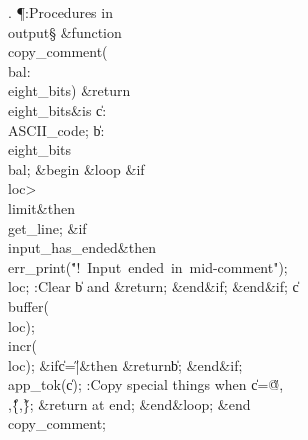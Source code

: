 . \P\?:Procedures in \\{output}\X\mathrel{+}\S\?\6
\&{function}\8\1\\{copy\_comment}\?(\1\?\\{bal}\?:\?\\{eight\_bits}\?\2)%
\&{return}\?\8\\{eight\_bits}\2\8\&{is}\8\1\6
\|c\?:\?\\{ASCII\_code};\6
\|b\?:\?\\{eight\_bits}\?\K\?\\{bal};\6
\4\&{begin}\6
\1\&{loop}\6
\&{if}\1\1\8\\{loc}\?>\?\\{limit}\2\8\&{then}\6
\\{get\_line};\6
\&{if}\1\1\8\\{input\_has\_ended}\2\8\&{then}\6
\\{err\_print}\?\1(\?\.{"!\ Input\ ended\ in\ mid-comment"}\?\2)\?;\6
\\{loc}\?\K{};\5
:Clear \|b and \?\&{return}\?\X;\2\6
\&{end}\8\2\&{if}\1;\2\6
\&{end}\8\2\&{if}\1;\6
\|c\?\K\?\\{buffer}\?\1(\?\\{loc}\?\2)\?;\5
\\{incr}\?\1(\?\\{loc}\?\2)\?;\6
\&{if}\1\1\8\|c\?=\?\H{|}\2\8\&{then}\6
\?\&{return}\?\8\|b;\2\6
\&{end}\8\2\&{if}\1;\6
\\{app\_tok}\?\1(\?\|c\?\2)\?;\6
:Copy special things when \|c\?=\?\H{@}\?,\?\H{\\}\?,\?\H{\{}\?,\?\H{\}}; %
\&{return} at end\X;\2\6
\&{end}\8\&{loop};\2\6
\&{end}\8\\{copy\_comment};\par
\fi


